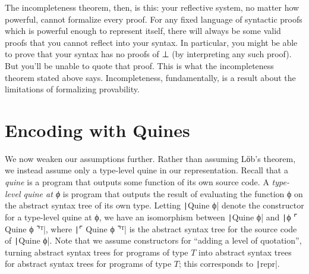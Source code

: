   The incompleteness theorem, then, is this: your reflective system,
  no matter how powerful, cannot formalize every proof.  For any fixed
  language of syntactic proofs which is powerful enough to represent
  itself, there will always be some valid proofs that you cannot
  reflect into your syntax.  In particular, you might be able to prove
  that your syntax has no proofs of ⊥ (by interpreting any such
  proof).  But you'll be unable to quote that proof.  This is what the
  incompleteness theorem stated above says.  Incompleteness,
  fundamentally, is a result about the limitations of formalizing
  provability.

\section{Encoding with Quines} \label{sec:100-lines-quine}


 We now weaken our assumptions further.  Rather than assuming Lӧb's
 theorem, we instead assume only a type-level quine in our
 representation.  Recall that a \emph{quine} is a program that outputs
 some function of its own source code.  A \emph{type-level quine at ϕ}
 is program that outputs the result of evaluating the function ϕ on
 the abstract syntax tree of its own type.  Letting
 \texttt|Quine ϕ| denote the constructor for a type-level
 quine at ϕ, we have an isomorphism between \texttt|Quine ϕ|
 and \texttt|ϕ ⌜ Quine ϕ ⌝ᵀ|, where
 \texttt|⌜ Quine ϕ ⌝ᵀ| is the abstract syntax tree for the
 source code of \texttt|Quine ϕ|.  Note that we assume
 constructors for ``adding a level of quotation'', turning abstract
 syntax trees for programs of type $T$ into abstract syntax trees for
 abstract syntax trees for programs of type $T$; this corresponds to
 \texttt|repr|.


